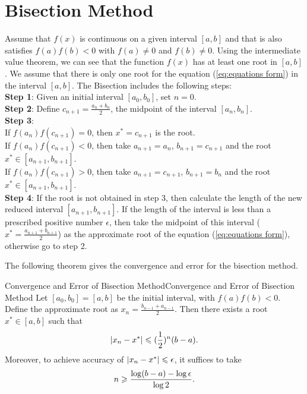 \section{Bisection Method}
Assume that $f(x)$ is continuous on a given interval $[a,b]$ 
and that is also satisfies $f(a)f(b)<0$
with $f(a)\neq 0$ and $f(b)\neq 0$.
Using the intermediate value theorem, we can see that the function $f(x)$
has at least one root in $[a,b]$.
We assume that there is only one root for the equation (\ref{eq:equations form})
in the interval $[a,b]$. The Bisection includes the following steps:\\
\textbf{Step 1}: Given an initial interval $[a_0,b_0]$, set $n=0$.\\
\textbf{Step 2}: Define $c_{n+1}=\frac{a_n+b_n}{2}$, the midpoint of the interval $[a_n,b_n]$.\\
\textbf{Step 3}:\\
If $f(a_n)f(c_{n+1})=0$, then $x^*=c_{n+1}$ is the root.\\
If $f(a_n)f(c_{n+1})<0$, then take $a_{n+1}=a_n$, $b_{n+1}=c_{n+1}$ and the root $x^*\in [a_{n+1},b_{n+1}]$.\\
If $f(a_n)f(c_{n+1})>0$, then take $a_{n+1}=c_{n+1}$, $b_{n+1}=b_n$ and the root $x^*\in [a_{n+1},b_{n+1}]$.
\\
\textbf{Step 4}: If the root is not obtained in step 3, then calculate the length of the new reduced interval $[a_{n+1},b_{n+1}]$.
If the length of the interval is less than a prescribed positive number $\epsilon$,
then take the midpoint of this interval ($x^*=\frac{a_{n+1}+b_{n+1}}{2}$) as the approximate root of the equation (\ref{eq:equations form}),
otherwise go to step 2. 
\par 
The following theorem gives the convergence and error for the bisection method.
\begin{theorem}{Convergence and Error of Bisection Method}{Convergence and Error of Bisection Method}
    Let $[a_0,b_0]=[a,b]$ be the initial interval, with $f(a)f(b)<0$.
    Define the approximate root as $x_n=\frac{b_{n-1}+a_{n-1}}{2}$.
    Then there exists a root $x^*\in [a,b]$ such that 
    \begin{align}
        |x_n-x^*|\leqslant (\frac{1}{2})^n (b-a).
    \end{align} 
    Moreover, to achieve accuracy of $|x_n-x^*|\leqslant \epsilon$, it suffices to take
    \begin{align}
        n\geqslant \frac{\log(b-a)-\log\epsilon}{\log 2}.
    \end{align}
\end{theorem}


